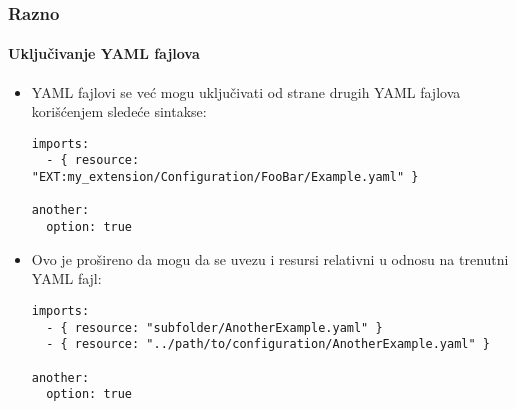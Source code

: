 
\begin{frame}[fragile]
	\frametitle{Razno}
	\framesubtitle{Uključivanje YAML fajlova}

	\lstset{basicstyle=\tiny\ttfamily}

	\begin{itemize}
		\item YAML fajlovi se već mogu uključivati od strane drugih YAML fajlova korišćenjem sledeće sintakse:

\begin{lstlisting}
imports:
  - { resource: "EXT:my_extension/Configuration/FooBar/Example.yaml" }

another:
  option: true
\end{lstlisting}

		\item Ovo je prošireno da mogu da se uvezu i resursi relativni u odnosu na trenutni YAML fajl:

\begin{lstlisting}
imports:
  - { resource: "subfolder/AnotherExample.yaml" }
  - { resource: "../path/to/configuration/AnotherExample.yaml" }

another:
  option: true
\end{lstlisting}

	\end{itemize}

\end{frame}

